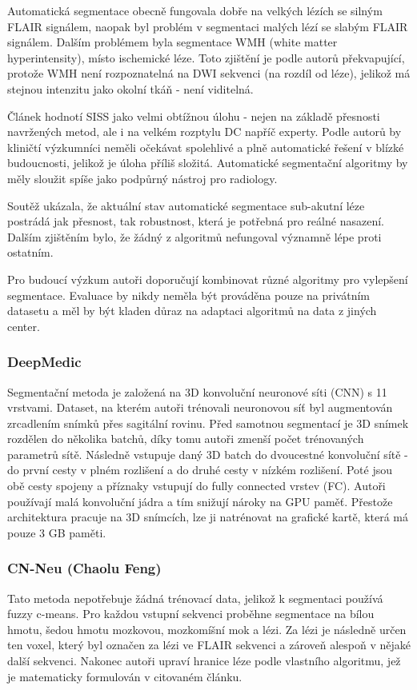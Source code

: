 \documentclass[11pt]{article}
\begin{document}
Automatická segmentace obecně fungovala dobře na velkých lézích se silným FLAIR signálem, naopak byl problém v segmentaci malých lézí se slabým FLAIR signálem. Dalším problémem byla segmentace WMH (\alert{white matter hyperintensity}), místo ischemické léze. Toto zjištění je podle autorů překvapující, protože WMH není rozpoznatelná na DWI sekvenci (na rozdíl od léze), jelikož má stejnou intenzitu jako okolní tkáň - není viditelná.

Článek hodnotí SISS jako velmi obtížnou úlohu - nejen na základě přesnosti navržených metod, ale i na velkém rozptylu DC napříč experty. Podle autorů by kliničtí výzkumníci neměli očekávat spolehlivé a plně automatické řešení v blízké budoucnosti, jelikož je úloha příliš složitá. Automatické segmentační algoritmy by měly sloužit spíše jako podpůrný nástroj pro radiology.

Soutěž ukázala, že aktuální stav automatické segmentace sub-akutní léze postrádá jak přesnost, tak robustnost, která je potřebná pro reálné nasazení. Dalším zjištěním bylo, že žádný z algoritmů nefungoval významně lépe proti ostatním.

Pro budoucí výzkum autoři doporučují kombinovat různé algoritmy pro vylepšení segmentace. Evaluace by nikdy neměla být prováděna pouze na privátním datasetu a měl by být kladen důraz na adaptaci algoritmů na data z jiných center.

\subsubsection{DeepMedic \cite{uk-imp2}}
Segmentační metoda je založená na 3D konvoluční neuronové síti (CNN) s 11 vrstvami. Dataset, na kterém autoři trénovali neuronovou síť byl augmentován zrcadlením snímků přes sagitální rovinu. Před samotnou segmentací je 3D snímek rozdělen do několika batchů, díky tomu autoři zmenší počet trénovaných parametrů sítě. Následně vstupuje daný 3D batch do dvoucestné konvoluční sítě - do první cesty v plném rozlišení a do druhé cesty v nízkém rozlišení. Poté jsou obě cesty spojeny a příznaky vstupují do fully connected vrstev (FC). Autoři používají malá konvoluční jádra a tím snižují nároky na GPU paměť. Přestože architektura pracuje na 3D snímcích, lze ji natrénovat na grafické kartě, která má pouze 3 GB paměti.

\subsubsection{CN-Neu (Chaolu Feng) \cite{cn-neu}}
Tato metoda nepotřebuje žádná trénovací data, jelikož k segmentaci používá fuzzy c-means. Pro každou vstupní sekvenci proběhne segmentace na bílou hmotu, šedou hmotu mozkovou, mozkomíšní mok a lézi. Za lézi je následně určen ten voxel, který byl označen za lézi ve FLAIR sekvenci a zároveň alespoň v nějaké další sekvenci. Nakonec autoři upraví hranice léze podle vlastního algoritmu, jež je matematicky formulován v citovaném článku.
\end{document}
